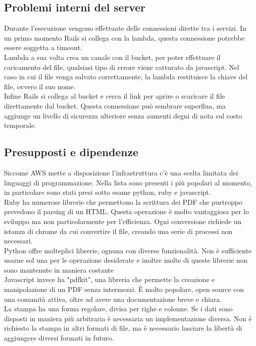 \documentclass[12pt]{article}
\begin{document}
\subsection{Problemi interni del server}
Durante l'esecuzione vengono effettuate delle connessioni dirette tra i servizi. 
In un primo momento Rails si collega con la lambda, questa connessione potrebbe 
essere soggetta a timeout. 
\\ Lambda a sua volta crea un canale con il bucket, per poter 
effettuare il caricamento del file, qualsiasi tipo di errore viene catturato da javascript.
Nel caso in cui il file venga salvato correttamente,
la lambda restituisce la chiave del file, ovvero il suo nome. 
\\ Infine Rails si collega al bucket e cerca il link per aprire o scaricare il file 
direttamente dal bucket.
Questa connessione può sembrare superflua, ma aggiunge 
un livello di sicurezza ulteriore senza aumenti degni di nota sul costo temporale. 


\subsection{Presupposti e dipendenze}
Siccome AWS mette a disposizione l'infrastruttura c'è una scelta limitata dei 
linguaggi di programmazione.
Nella lista sono presenti i più popolari al momento,
in particolare sono stati presi sotto esame python, ruby e javascript.
\\ Ruby ha numerose librerie che permettono la scrittura dei PDF che purtroppo
prevedono il parsing di un HTML.
Questa operazione è molto vantaggiosa per lo sviluppo ma non particolarmente 
per l'efficienza.
Ogni conversione richiede un istanza di chrome da cui convertire il file,
creando una serie di processi non necessari.  
\\ Python offre molteplici librerie, ognuna con diverse funzionalità. Non è 
sufficiente usarne sol una per le operazione desiderate e inoltre 
molte di queste librerie non sono mantenute in maniera costante
\\ Javascript invece ha "pdfkit", una libreria che permette la creazione e manipolazione 
di un PDF senza intermezzi. È molto popolare, open source con una comunità 
attiva, oltre ad avere una documentazione breve e chiara.
\\ La stampa ha una forma regolare, divisa per righe e colonne. Se i dati sono 
disposti in maniera più arbitraria è necessaria un implementazione diversa. 
Non è richiesto la stampa in altri formati di file, ma è necessario lasciare 
la libertà di aggiungere diversi formati in futuro.
\end{document}
